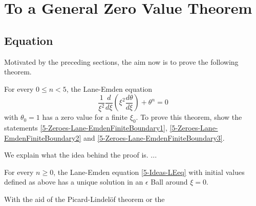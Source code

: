 \section{To a General Zero Value Theorem}
\subsection{ Equation}
Motivated by the preceding sections, the aim now is to prove the following theorem.
\begin{theorem}
	\label{5-Zeroes-Lane-EmdenFiniteBoundary}
	For every $0\leq n<5$, the Lane-Emden equation
	\begin{equation}
		\frac{1}{\xi^2}\frac{d}{d\xi}\left(\xi^2\frac{d\theta}{d\xi}\right)+\theta^n=0
		\label{5-Ideas-LEeq}
	\end{equation}
	with $\theta_0=1$ has a zero value for a finite $\xi_0$. To prove this theorem, show the statements \ref{5-Zeroes-Lane-EmdenFiniteBoundary1}, 
	\ref{5-Zeroes-Lane-EmdenFiniteBoundary2} and \ref{5-Zeroes-Lane-EmdenFiniteBoundary3}.
\end{theorem}
We explain what the idea behind the proof is.
...
\begin{lemma}
	\label{5-Zeroes-Lane-EmdenFiniteBoundary1}
	For every $n\geq0$, the Lane-Emden equation \ref{5-Ideas-LEeq} with initial values defined as above has a unique solution in an $\epsilon$ Ball around $\xi=0$.
\end{lemma}
With the aid of the Picard-Lindelöf theorem or the 

